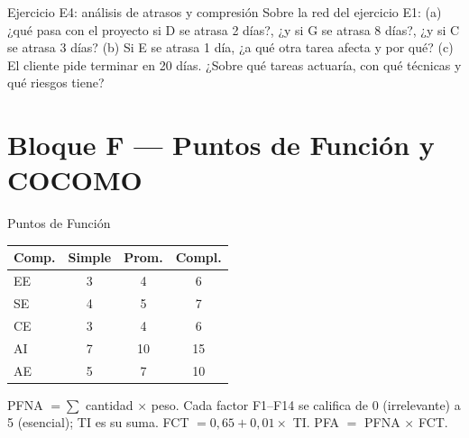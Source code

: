 \documentclass[11pt,a4paper]{article}
\begin{document}
\begin{enunciado}{Ejercicio E4: análisis de atrasos y compresión}
Sobre la red del ejercicio E1: (a) ¿qué pasa con el proyecto si D se atrasa 2 días?, ¿y si G se atrasa 8 días?, ¿y
si C se atrasa 3 días? (b) Si E se atrasa 1 día, ¿a qué otra tarea afecta y por qué? (c) El cliente pide terminar
en 20 días. ¿Sobre qué tareas actuaría, con qué técnicas y qué riesgos tiene?
\end{enunciado}

\section{Bloque F --- Puntos de Función y COCOMO}
\begin{plantilla}{Puntos de Función}
\begin{minipage}[t]{0.45\linewidth}
\begin{tabular}{lccc}
\toprule
Comp. & Simple & Prom. & Compl.\\
\midrule
EE & 3 & 4 & 6\\
SE & 4 & 5 & 7\\
CE & 3 & 4 & 6\\
AI & 7 & 10 & 15\\
AE & 5 & 7 & 10\\
\bottomrule
\end{tabular}
\end{minipage}\hfill
\begin{minipage}[t]{0.52\linewidth}
PFNA $= \sum$ cantidad $\times$ peso. Cada factor F1--F14 se califica de 0 (irrelevante) a 5 (esencial); TI es su
suma. FCT $= 0{,}65 + 0{,}01 \times$ TI. PFA $=$ PFNA $\times$ FCT.
\end{minipage}
\end{plantilla}
\end{document}

